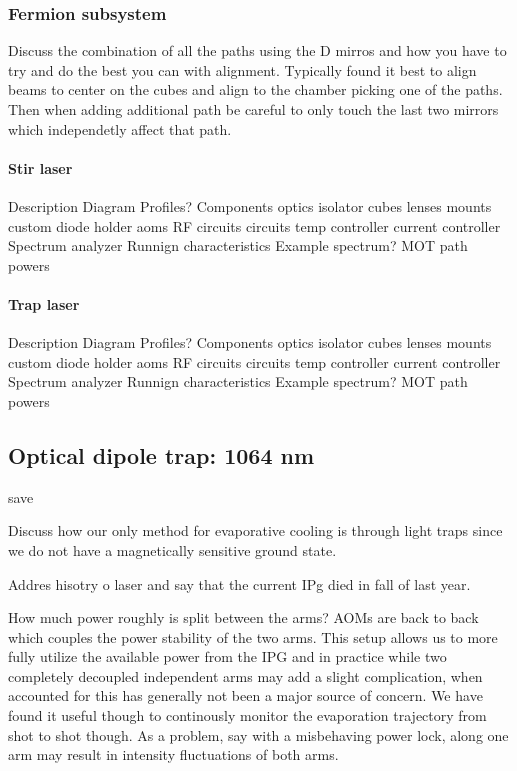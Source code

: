 \subsubsection{Fermion subsystem}

Discuss the combination of all the paths using the D mirros and how you have to try and do the best you can with alignment. Typically found it best to align beams to center on the cubes and align to the chamber picking one of the paths. Then when adding additional path be careful to only touch the last two mirrors which independetly affect that path.

\paragraph{Stir laser}

Description
Diagram
	Profiles?
Components
	optics
		isolator
		cubes
		lenses
	mounts
		custom diode holder
	aoms
		RF circuits
	circuits
		temp controller
		current controller
	Spectrum analyzer
Runnign characteristics
	Example spectrum?
	MOT path powers

\paragraph{Trap laser}

Description
Diagram
	Profiles?
Components
	optics
		isolator
		cubes
		lenses
	mounts
		custom diode holder
	aoms
		RF circuits
	circuits
		temp controller
		current controller
	Spectrum analyzer
Runnign characteristics
	Example spectrum?
	MOT path powers

\subsection{Optical dipole trap: 1064 nm} \label{ssec:1064sys}

save

Discuss how our only method for evaporative cooling is through light traps since we do not have a magnetically sensitive ground state.

Addres hisotry o laser and say that the current IPg died in fall of last year. 

How much power roughly is split between the arms? AOMs are back to back which couples the power stability of the two arms. This setup allows us to more fully utilize the available power from the IPG and in practice while two completely decoupled independent arms may add a slight complication, when accounted for this has generally not been a major source of concern. We have found it useful though to continously monitor the evaporation trajectory from shot to shot though. As a problem, say with a misbehaving power lock, along one arm may result in intensity fluctuations of both arms.

